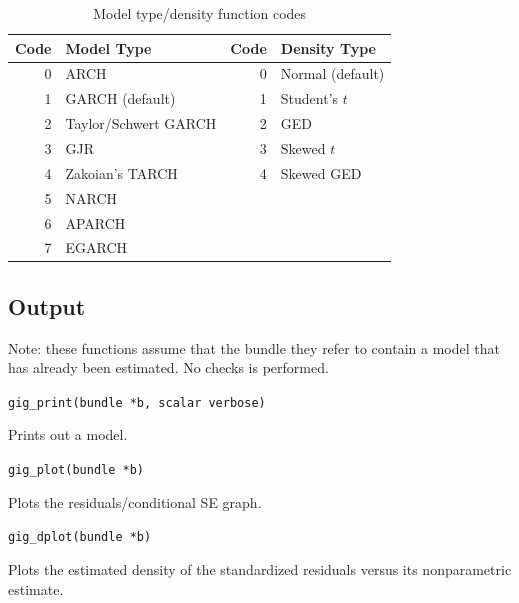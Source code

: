 \documentclass[a4paper,11pt]{article}
\newenvironment{funcdoc}[1]
{\noindent\hrulefill\newline\texttt{#1}\par\noindent\hrulefill\par\medskip\par}
{\bigskip}
\begin{document}
\begin{table}[htbp]
  \centering
  \begin{tabular}{rl|rl}
    \hline
    \textbf{Code} & \textbf{Model Type} & \textbf{Code} & \textbf{Density Type} \\
    \hline
    0 & ARCH & 0 & Normal (default) \\
    1 & GARCH (default) & 1 & Student's $t$ \\
    2 & Taylor/Schwert GARCH & 2 & GED\\
    3 & GJR & 3 & Skewed $t$ \\
    4 & Zakoian's TARCH & 4 & Skewed GED \\
    5 & NARCH \\
    6 & APARCH \\
    7 & EGARCH \\
    \hline
    \hline
  \end{tabular}
  \caption{Model type/density function codes}
  \label{tab:modelcodes}
\end{table}

\subsection{Output}
\label{sec:syntax_output}

Note: these functions assume that the bundle they refer to contain a
model that has already been estimated. No checks is performed.

\begin{funcdoc}{gig\_print(bundle *b, scalar verbose)}
  Prints out a model.
\end{funcdoc}

\begin{funcdoc}{gig\_plot(bundle *b)}
  Plots the residuals/conditional SE graph.
\end{funcdoc}

\begin{funcdoc}{gig\_dplot(bundle *b)}
  Plots the estimated density of the standardized residuals versus its
  nonparametric estimate.
\end{funcdoc}

\clearpage
\end{document}
